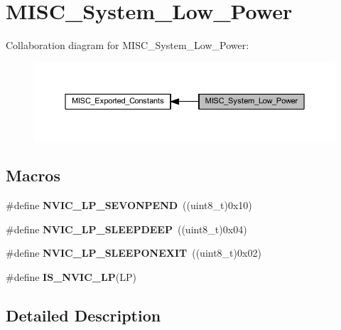 \hypertarget{group___m_i_s_c___system___low___power}{}\section{M\+I\+S\+C\+\_\+\+System\+\_\+\+Low\+\_\+\+Power}
\label{group___m_i_s_c___system___low___power}
Collaboration diagram for M\+I\+S\+C\+\_\+\+System\+\_\+\+Low\+\_\+\+Power\+:
\nopagebreak
\begin{figure}[H]
\begin{center}
\leavevmode
\includegraphics[width=350pt]{group___m_i_s_c___system___low___power}
\end{center}
\end{figure}
\subsection*{Macros}
\begin{DoxyCompactItemize}
\item 
\mbox{\label{group___m_i_s_c___system___low___power_ga10748d2b2875afd122f6476864ad6cae}} 
\#define {\bfseries N\+V\+I\+C\+\_\+\+L\+P\+\_\+\+S\+E\+V\+O\+N\+P\+E\+ND}~((uint8\+\_\+t)0x10)
\item 
\mbox{\label{group___m_i_s_c___system___low___power_gaeec2d10922fa9ec5e65398667b303253}} 
\#define {\bfseries N\+V\+I\+C\+\_\+\+L\+P\+\_\+\+S\+L\+E\+E\+P\+D\+E\+EP}~((uint8\+\_\+t)0x04)
\item 
\mbox{\label{group___m_i_s_c___system___low___power_ga368dc13a9c762a307c07cfa2e3ef59ad}} 
\#define {\bfseries N\+V\+I\+C\+\_\+\+L\+P\+\_\+\+S\+L\+E\+E\+P\+O\+N\+E\+X\+IT}~((uint8\+\_\+t)0x02)
\item 
\#define {\bfseries I\+S\+\_\+\+N\+V\+I\+C\+\_\+\+LP}(LP)
\end{DoxyCompactItemize}


\subsection{Detailed Description}


